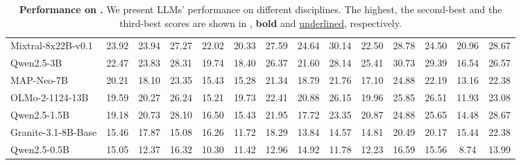 {\begin{table}[p]
{\begin{tabular}{lccccccccccccc}
\rowcolor{color32}
Mixtral-8x22B-v0.1& 23.92& 23.94& 27.27& 22.02& 20.33& 27.59& 24.64& 30.14& 22.50& 28.78& 24.50& 20.96& 28.67 \\
\rowcolor{color32}
Qwen2.5-3B& 22.47& 23.83& 28.31& 19.74& 18.40& 26.37& 21.60& 28.14& 25.41& 30.73& 29.39& 16.54& 26.57 \\
\rowcolor{color32}
MAP-Neo-7B& 20.21& 18.10& 23.35& 15.43& 15.28& 21.34& 18.79& 21.76& 17.10& 24.88& 22.19& 13.16& 22.38 \\
\rowcolor{color32}
OLMo-2-1124-13B& 19.59& 20.27& 26.24& 15.21& 19.73& 22.41& 20.88& 26.15& 19.96& 25.85& 26.51& 11.93& 23.08 \\
\rowcolor{color32}
Qwen2.5-1.5B& 19.18& 20.73& 28.10& 16.50& 15.43& 21.95& 17.72& 23.35& 20.87& 24.88& 25.65& 14.48& 28.67 \\
\rowcolor{color32}
Granite-3.1-8B-Base& 15.46& 17.87& 15.08& 16.26& 11.72& 18.29& 13.84& 14.57& 14.81& 20.49& 20.17& 15.44& 22.38 \\
\rowcolor{color32}
Qwen2.5-0.5B& 15.05& 12.37& 16.32& 10.30& 11.42& 12.96& 14.92& 11.78& 12.23& 16.59& 15.56& 8.74& 13.99 \\

\bottomrule
\end{tabular}
}
\captionsetup{font=footnotesize}
\caption{\textbf{Performance on \benchmark.} 
We present LLMs' performance on different disciplines. The highest, the second-best and the third-best scores are shown in  , \textbf{bold} and \underline{underlined}, respectively.}
\label{performance2}
\end{table}
}

